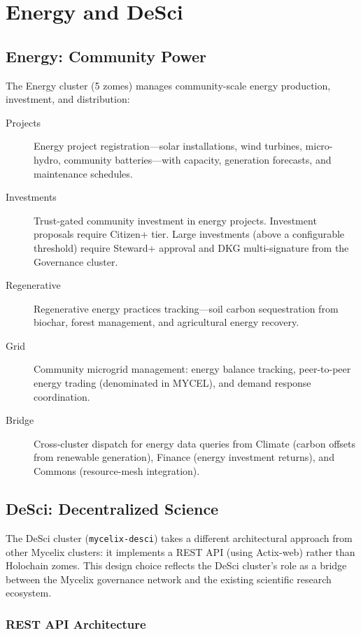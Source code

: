 \documentclass[12pt]{book}
\begin{document}
\chapter{Energy and DeSci}

\section{Energy: Community Power}

The Energy cluster (5 zomes) manages community-scale energy production,
investment, and distribution:

\begin{description}
  \item[Projects] Energy project registration---solar installations, wind
    turbines, micro-hydro, community batteries---with capacity,
    generation forecasts, and maintenance schedules.
  \item[Investments] Trust-gated community investment in energy projects.
    Investment proposals require Citizen+ tier. Large investments
    (above a configurable threshold) require Steward+ approval and
    DKG multi-signature from the Governance cluster.
  \item[Regenerative] Regenerative energy practices tracking---soil
    carbon sequestration from biochar, forest management, and agricultural
    energy recovery.
  \item[Grid] Community microgrid management: energy balance tracking,
    peer-to-peer energy trading (denominated in MYCEL), and demand
    response coordination.
  \item[Bridge] Cross-cluster dispatch for energy data queries from
    Climate (carbon offsets from renewable generation), Finance
    (energy investment returns), and Commons (resource-mesh integration).
\end{description}

\section{DeSci: Decentralized Science}

The DeSci cluster (\texttt{mycelix-desci}) takes a different architectural
approach from other Mycelix clusters: it implements a REST API (using
Actix-web) rather than Holochain zomes. This design choice reflects the
DeSci cluster's role as a bridge between the Mycelix governance network
and the existing scientific research ecosystem.

\subsection{REST API Architecture}
\end{document}
